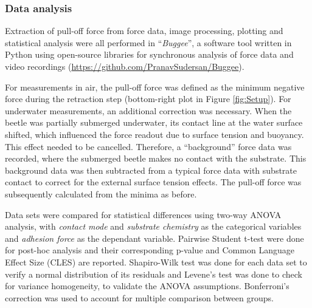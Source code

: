 \documentclass[vruler,JEB]{COB}%
\begin{document}

\subsubsection{Data analysis}

Extraction of pull-off force from force data, image processing, plotting
and statistical analysis were all performed in ``\emph{Buggee}'',
a software tool written in Python using open-source libraries for synchronous
analysis of force data and video recordings (\url{https://github.com/PranavSudersan/Buggee}). 

For measurements in air, the pull-off force was defined as the minimum
negative force during the retraction step (bottom-right plot in Figure \ref{fig:Setup}).
For underwater measurements, an additional correction was necessary.
When the beetle was partially submerged underwater, its contact line at the
water surface shifted, which influenced the force readout due to surface
tension and buoyancy. This effect needed to be cancelled. Therefore, a ``background''
force data was recorded, where the submerged beetle makes no contact
with the substrate. This background data was then subtracted from
a typical force data with substrate contact to correct for the external
surface tension effects. The pull-off force was subsequently calculated
from the minima as before. 

Data sets were compared for statistical differences using two-way ANOVA analysis, with \emph{contact mode} and \emph{substrate chemistry} as the categorical variables and \emph{adhesion force} as the dependant variable. Pairwise
Student t-test were done for post-hoc analysis and their corresponding p-value and Common Language
Effect Size (CLES) are reported. Shapiro-Wilk test was done for each
data set to verify a normal distribution of its residuals and Levene's
test was done to check for variance homogeneity, to validate the ANOVA 
assumptions. Bonferroni's correction was used to account for multiple
comparison between groups.
\end{document}
